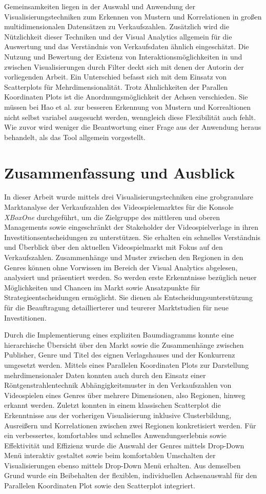 \documentclass[usegeometry=true]{scrartcl}
\begin{document}
Gemeinsamkeiten liegen in der Auswahl und Anwendung der Visualisierungstechniken zum Erkennen von Mustern und Korrelationen 
in großen multidimensionalen Datensätzen zu Verkaufszahlen.
Zusätzlich wird die Nützlichkeit dieser Techniken und der Visual Analytics allgemein für die Auswertung und 
das Verständnis von Verkaufsdaten ähnlich eingeschätzt.
Die Nutzung und Bewertung der Existenz von Interaktionsmöglichkeiten in und zwischen Visualisierungen durch Filter 
deckt sich mit denen der Autorin der vorliegenden Arbeit.
Ein Unterschied befasst sich mit dem Einsatz von Scatterplots für Mehrdimensionalität.
Trotz Ähnlichkeiten der Parallen Koordinaten Plots ist die Anordnungsmöglichkeit der Achsen verschieden. 
Sie müssen bei Hao et al. zur besseren Erkennung von Mustern und Korrealtionen nicht selbst variabel ausgesucht werden, 
wenngleich diese Flexibilität auch fehlt.
Wie zuvor wird weniger die Beantwortung einer Frage aus der Anwendung heraus behandelt, als das Tool allgemein vorgestellt.

\section{Zusammenfassung und Ausblick}
In dieser Arbeit wurde mittels drei Visualisierungstechniken eine grobgranulare Marktanalyse 
der Verkaufszahlen des Videospielemarktes für die Konsole \textit{XBoxOne} durchgeführt, 
um die Zielgruppe des mittleren und oberen Managements sowie eingeschränkt der Stakeholder der Videospielverlage 
in ihren Investitionsentscheidungen zu unterstützen.
Sie erhalten ein schnelles Verständnis und Überblick über den aktuellen Videospielmarkt mit Fokus auf den Verkaufszahlen.
Zusammenhänge und Muster zwischen den Regionen in den Genres können ohne Vorwissen im Bereich der Visual Analytics abgelesen, analysiert und präsentiert werden.
So werden erste Erkenntnisse bezüglich neuer Möglichkeiten und Chancen im Markt sowie Ansatzpunkte für Strategieentscheidungen ermöglicht. 
Sie dienen als Entscheidungsunterstützung für die Beauftragung detaillierterer und teurerer Marktstudien für neue Investitionen.
 
Durch die Implementierung eines expliziten Baumdiagramms konnte eine hierarchische Übersicht über den Markt sowie die Zusammenhänge zwischen Publisher, Genre und Titel des eignen Verlagshauses und der Konkurrenz umgesetzt werden.
Mittels eines Parallelen Koordinaten Plots zur Darstellung mehrdimensionaler Daten konnten auch durch den Einsatz einer Röntgenstrahlentechnik 
Abhängigkeitsmuster in den Verkaufszahlen von Videospielen eines Genres über mehrere Dimensionen, also Regionen, hinweg erkannt werden.
Zuletzt konnten in einem klassischen Scatterplot die Erkenntnisse aus der vorherigen Visualisierung inklusive Clusterbildung, 
Ausreißern und Korrelationen zwischen zwei Regionen konkretisiert werden. 
Für ein verbessertes, komfortables und schnelles Anwendungserlebnis sowie Effektivität und Effizienz wurde die Auswahl der Genres mittels Drop-Down Menü interaktiv gestaltet 
sowie beim komfortablen Umschalten der Visualisierungen ebenso mittels Drop-Down Menü erhalten.
Aus demselben Grund wurde ein Beibehalten der flexiblen, individuellen Achsenauswahl für den Parallelen Koordinaten Plot sowie den Scatterplot integriert.
\end{document}
